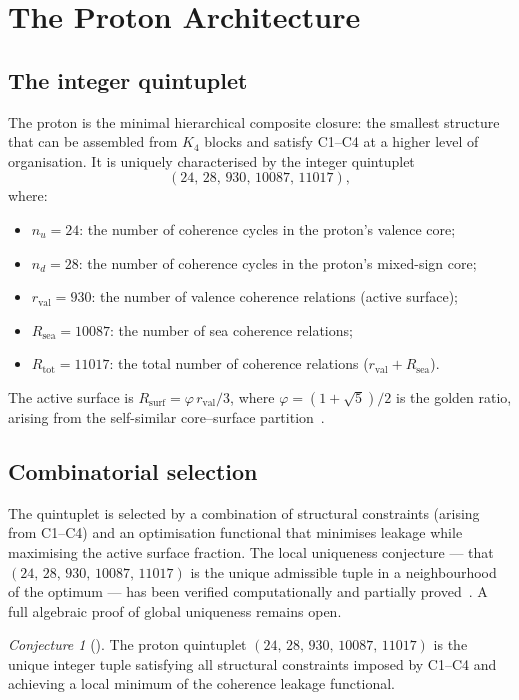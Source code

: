 \documentclass[11pt,a4paper]{article}
\theoremstyle{plain}
\theoremstyle{definition}
\theoremstyle{remark}
\newtheorem{conjecture}[theorem]{Conjecture}
\newcommand{\Kfour}{K_4}
\newcommand{\quintuplet}{(24,\,28,\,930,\,10087,\,11017)}
\newcommand{\rval}{r_{\mathrm{val}}}
\newcommand{\Rsurf}{R_{\mathrm{surf}}}
\newcommand{\Rtot}{R_{\mathrm{tot}}}
\begin{document}
\section{The Proton Architecture}
\label{sec:proton}

\subsection{The integer quintuplet}
\label{subsec:quintuplet}

The proton is the minimal hierarchical composite closure: the smallest structure that can be assembled from $\Kfour$ blocks and satisfy C1--C4 at a higher level of organisation.
It is uniquely characterised by the integer quintuplet
\[
\quintuplet,
\]
where:
\begin{itemize}
\item $n_u = 24$: the number of coherence cycles in the proton's valence core;
\item $n_d = 28$: the number of coherence cycles in the proton's mixed-sign core;
\item $\rval = 930$: the number of valence coherence relations (active surface);
\item $R_{\mathrm{sea}} = 10087$: the number of sea coherence relations;
\item $\Rtot = 11017$: the total number of coherence relations ($\rval + R_{\mathrm{sea}}$).
\end{itemize}

The active surface is $\Rsurf = \varphi\,\rval/3$, where $\varphi=(1+\sqrt{5})/2$ is the golden ratio, arising from the self-similar core--surface partition~\citep{D05,D12}.

\subsection{Combinatorial selection}
\label{subsec:combinatorial}

The quintuplet is selected by a combination of structural constraints (arising from C1--C4) and an optimisation functional that minimises leakage while maximising the active surface fraction.
The local uniqueness conjecture — that $\quintuplet$ is the unique admissible tuple in a neighbourhood of the optimum — has been verified computationally and partially proved~\citep{D16,D16b}.
A full algebraic proof of global uniqueness remains open.

\begin{conjecture}[\citep{D16b}]
\label{conj:uniqueness}
The proton quintuplet $\quintuplet$ is the unique integer tuple satisfying all structural constraints imposed by C1--C4 and achieving a local minimum of the coherence leakage functional.
\end{conjecture}
\end{document}
